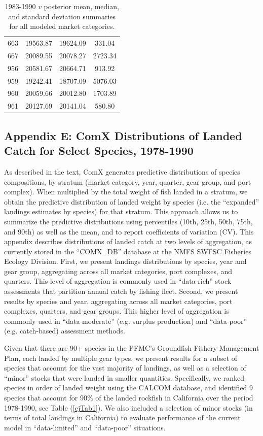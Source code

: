 \documentclass[12pt]{article}
\begin{document}
\begin{table}[h!]
\begin{minipage}[c]{0.45\textwidth}
\begin{tabular}{cccc}
663 & 19563.87 & 19624.09 & 331.04      \\
667 & 20089.55 & 20078.27 & 2723.34     \\
956 & 20581.67 & 20664.71 & 913.92      \\
959 & 19242.41 & 18707.09 & 5076.03     \\
960 & 20059.66 & 20012.80 & 1703.89     \\
961 & 20127.69 & 20141.04 & 580.80      \\
\hline
\end{tabular}
\caption{1983-1990 $v$ posterior mean, median, and standard deviation  
summaries for all modeled market categories.}
\label{v83}
\end{minipage}
\end{table}

%
\clearpage
%

\subsection{Appendix E: ComX Distributions of Landed Catch for Select Species, 1978-1990}\label{appEJ}

%
As described in the text, ComX generates predictive distributions of species 
compositions, by stratum (market category, year, quarter, gear group, and port 
complex). When multiplied by the total weight of fish landed in a stratum, we 
obtain the predictive distribution of landed weight by species (i.e. the 
``expanded'' landings estimates by species) for that stratum. This approach 
allows us to summarize the predictive distributions using percentiles (10th, 
25th, 50th, 75th, and 90th) as well as the mean, and to report coefficients of 
variation (CV). This appendix describes distributions of landed catch at two 
levels of aggregation, as currently stored in the ``COMX\_DB'' database at the 
NMFS SWFSC Fisheries Ecology Division. First, we present landings 
distributions by species, year and gear group, aggregating across all market 
categories, port complexes, and quarters. This level of aggregation is 
commonly used in ``data-rich'' stock assessments that partition annual catch by 
fishing fleet. Second, we present results by species and year, aggregating 
across all market categories, port complexes, quarters, and gear groups. This 
higher level of aggregation is commonly used in ``data-moderate'' (e.g. surplus 
production) and ``data-poor'' (e.g. catch-based) assessment methods.

%
Given that there are 90+ species in the PFMC’s Groundfish Fishery Management 
Plan, each landed by multiple gear types, we present results for a subset of 
species that account for the vast majority of landings, as well as a selection 
of ``minor'' stocks that were landed in smaller quantities. Specifically, we 
ranked species in order of landed weight using the CALCOM database, and 
identified 9 species that account for 90\% of the landed rockfish in California 
over the period 1978-1990, see Table (\ref{ejTab1}). We also included a 
selection of minor stocks (in terms of total landings in California) to 
evaluate performance of the current model in ``data-limited'' and ``data-poor'' 
situations.
\end{document}

